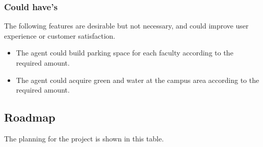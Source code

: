 \subsubsection{Could have's}
The following features are desirable but not necessary, and could improve user experience or customer satisfaction.
\begin{itemize}
	\item The agent could build parking space for each faculty according to the required amount.
	\item The agent could acquire green and water at the campus area according to the required amount.
\end{itemize}

\subsection{Roadmap}
The planning for the project is shown in this table.

